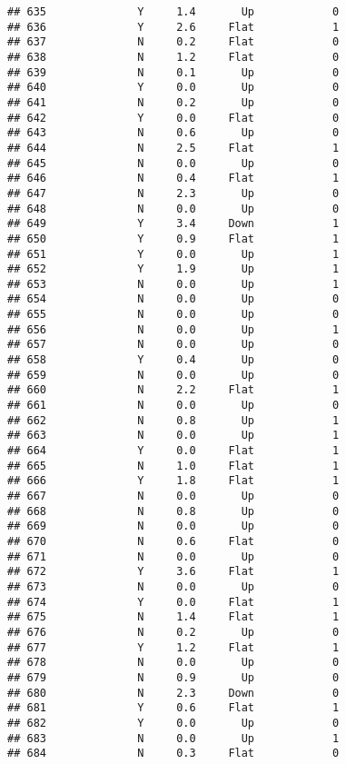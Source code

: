 \documentclass[
]{article}
\begin{document}
\begin{verbatim}
## 635              Y     1.4       Up            0
## 636              Y     2.6     Flat            1
## 637              N     0.2     Flat            0
## 638              N     1.2     Flat            0
## 639              N     0.1       Up            0
## 640              Y     0.0       Up            0
## 641              N     0.2       Up            0
## 642              Y     0.0     Flat            0
## 643              N     0.6       Up            0
## 644              N     2.5     Flat            1
## 645              N     0.0       Up            0
## 646              N     0.4     Flat            1
## 647              N     2.3       Up            0
## 648              N     0.0       Up            0
## 649              Y     3.4     Down            1
## 650              Y     0.9     Flat            1
## 651              Y     0.0       Up            1
## 652              Y     1.9       Up            1
## 653              N     0.0       Up            1
## 654              N     0.0       Up            0
## 655              N     0.0       Up            0
## 656              N     0.0       Up            1
## 657              N     0.0       Up            0
## 658              Y     0.4       Up            0
## 659              N     0.0       Up            0
## 660              N     2.2     Flat            1
## 661              N     0.0       Up            0
## 662              N     0.8       Up            1
## 663              N     0.0       Up            1
## 664              Y     0.0     Flat            1
## 665              N     1.0     Flat            1
## 666              Y     1.8     Flat            1
## 667              N     0.0       Up            0
## 668              N     0.8       Up            0
## 669              N     0.0       Up            0
## 670              N     0.6     Flat            0
## 671              N     0.0       Up            0
## 672              Y     3.6     Flat            1
## 673              N     0.0       Up            0
## 674              Y     0.0     Flat            1
## 675              N     1.4     Flat            1
## 676              N     0.2       Up            0
## 677              Y     1.2     Flat            1
## 678              N     0.0       Up            0
## 679              N     0.9       Up            0
## 680              N     2.3     Down            0
## 681              Y     0.6     Flat            1
## 682              Y     0.0       Up            0
## 683              N     0.0       Up            1
## 684              N     0.3     Flat            0

\end{verbatim}
\end{document}
